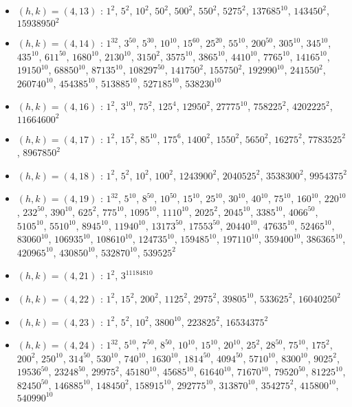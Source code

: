 \begin{itemize}
\item $(h,k)=(4,13)$ : $1^{2}$, $5^{2}$, $10^{2}$, $50^{2}$, $500^{2}$, $550^{2}$, $5275^{2}$, $137685^{10}$, $143450^{2}$, $15938950^{2}$
\item $(h,k)=(4,14)$ : $1^{32}$, $3^{50}$, $5^{30}$, $10^{10}$, $15^{60}$, $25^{20}$, $55^{10}$, $200^{50}$, $305^{10}$, $345^{10}$, $435^{10}$, $611^{50}$, $1680^{10}$, $2130^{10}$, $3150^{2}$, $3575^{10}$, $3865^{10}$, $4410^{10}$, $7765^{10}$, $14165^{10}$, $19150^{10}$, $68850^{10}$, $87135^{10}$, $108297^{50}$, $141750^{2}$, $155750^{2}$, $192990^{10}$, $241550^{2}$, $260740^{10}$, $454385^{10}$, $513885^{10}$, $527185^{10}$, $538230^{10}$
\item $(h,k)=(4,16)$ : $1^{2}$, $3^{10}$, $75^{2}$, $125^{4}$, $12950^{2}$, $27775^{10}$, $758225^{2}$, $4202225^{2}$, $11664600^{2}$
\item $(h,k)=(4,17)$ : $1^{2}$, $15^{2}$, $85^{10}$, $175^{6}$, $1400^{2}$, $1550^{2}$, $5650^{2}$, $16275^{2}$, $7783525^{2}$, $8967850^{2}$
\item $(h,k)=(4,18)$ : $1^{2}$, $5^{2}$, $10^{2}$, $100^{2}$, $1243900^{2}$, $2040525^{2}$, $3538300^{2}$, $9954375^{2}$
\item $(h,k)=(4,19)$ : $1^{32}$, $5^{10}$, $8^{50}$, $10^{50}$, $15^{10}$, $25^{10}$, $30^{10}$, $40^{10}$, $75^{10}$, $160^{10}$, $220^{10}$, $232^{50}$, $390^{10}$, $625^{2}$, $775^{10}$, $1095^{10}$, $1110^{10}$, $2025^{2}$, $2045^{10}$, $3385^{10}$, $4066^{50}$, $5105^{10}$, $5510^{10}$, $8945^{10}$, $11940^{10}$, $13173^{50}$, $17553^{50}$, $20440^{10}$, $47635^{10}$, $52465^{10}$, $83060^{10}$, $106935^{10}$, $108610^{10}$, $124735^{10}$, $159485^{10}$, $197110^{10}$, $359400^{10}$, $386365^{10}$, $420965^{10}$, $430850^{10}$, $532870^{10}$, $539525^{2}$
\item $(h,k)=(4,21)$ : $1^{2}$, $3^{11184810}$
\item $(h,k)=(4,22)$ : $1^{2}$, $15^{2}$, $200^{2}$, $1125^{2}$, $2975^{2}$, $39805^{10}$, $533625^{2}$, $16040250^{2}$
\item $(h,k)=(4,23)$ : $1^{2}$, $5^{2}$, $10^{2}$, $3800^{10}$, $223825^{2}$, $16534375^{2}$
\item $(h,k)=(4,24)$ : $1^{32}$, $5^{10}$, $7^{50}$, $8^{50}$, $10^{10}$, $15^{10}$, $20^{10}$, $25^{2}$, $28^{50}$, $75^{10}$, $175^{2}$, $200^{2}$, $250^{10}$, $314^{50}$, $530^{10}$, $740^{10}$, $1630^{10}$, $1814^{50}$, $4094^{50}$, $5710^{10}$, $8300^{10}$, $9025^{2}$, $19536^{50}$, $23248^{50}$, $29975^{2}$, $45180^{10}$, $45685^{10}$, $61640^{10}$, $71670^{10}$, $79520^{50}$, $81225^{10}$, $82450^{50}$, $146885^{10}$, $148450^{2}$, $158915^{10}$, $292775^{10}$, $313870^{10}$, $354275^{2}$, $415800^{10}$, $540990^{10}$

\end{itemize}

